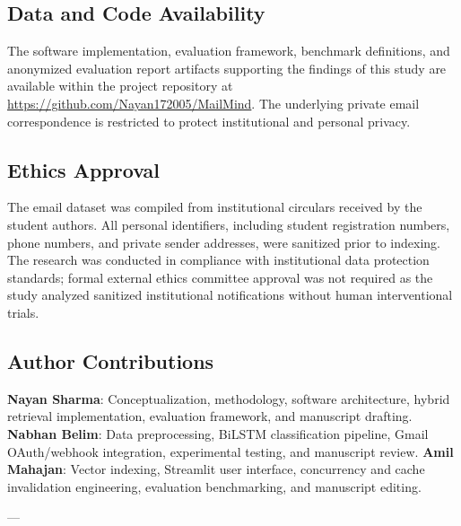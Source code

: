 \documentclass[11pt,a4paper]{article}
\begin{document}
\subsection*{Data and Code Availability}
The software implementation, evaluation framework, benchmark definitions, and anonymized evaluation report artifacts supporting the findings of this study are available within the project repository at \url{https://github.com/Nayan172005/MailMind}. The underlying private email correspondence is restricted to protect institutional and personal privacy.

\subsection*{Ethics Approval}
The email dataset was compiled from institutional circulars received by the student authors. All personal identifiers, including student registration numbers, phone numbers, and private sender addresses, were sanitized prior to indexing. The research was conducted in compliance with institutional data protection standards; formal external ethics committee approval was not required as the study analyzed sanitized institutional notifications without human interventional trials.

\subsection*{Author Contributions}
\textbf{Nayan Sharma}: Conceptualization, methodology, software architecture, hybrid retrieval implementation, evaluation framework, and manuscript drafting.  
\textbf{Nabhan Belim}: Data preprocessing, BiLSTM classification pipeline, Gmail OAuth/webhook integration, experimental testing, and manuscript review.  
\textbf{Amil Mahajan}: Vector indexing, Streamlit user interface, concurrency and cache invalidation engineering, evaluation benchmarking, and manuscript editing.

---



\end{document}
